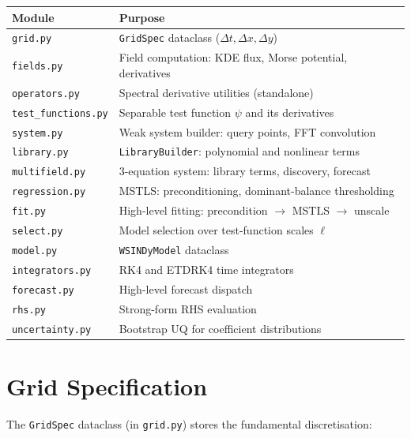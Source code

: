 \documentclass[11pt]{article}
\begin{document}
\begin{center}
\begin{tabular}{ll}
\toprule
\textbf{Module} & \textbf{Purpose} \\
\midrule
\texttt{grid.py}            & \texttt{GridSpec} dataclass ($\Delta t, \Delta x, \Delta y$) \\
\texttt{fields.py}          & Field computation: KDE flux, Morse potential, derivatives \\
\texttt{operators.py}       & Spectral derivative utilities (standalone) \\
\texttt{test\_functions.py} & Separable test function $\psi$ and its derivatives \\
\texttt{system.py}          & Weak system builder: query points, FFT convolution \\
\texttt{library.py}         & \texttt{LibraryBuilder}: polynomial and nonlinear terms \\
\texttt{multifield.py}      & 3-equation system: library terms, discovery, forecast \\
\texttt{regression.py}      & MSTLS: preconditioning, dominant-balance thresholding \\
\texttt{fit.py}             & High-level fitting: precondition $\to$ MSTLS $\to$ unscale \\
\texttt{select.py}          & Model selection over test-function scales $\ell$ \\
\texttt{model.py}           & \texttt{WSINDyModel} dataclass \\
\texttt{integrators.py}     & RK4 and ETDRK4 time integrators \\
\texttt{forecast.py}        & High-level forecast dispatch \\
\texttt{rhs.py}             & Strong-form RHS evaluation \\
\texttt{uncertainty.py}     & Bootstrap UQ for coefficient distributions \\
\bottomrule
\end{tabular}
\end{center}


\section{Grid Specification}
\label{sec:grid}

The \texttt{GridSpec} dataclass (in \texttt{grid.py}) stores the fundamental discretisation:
\end{document}
